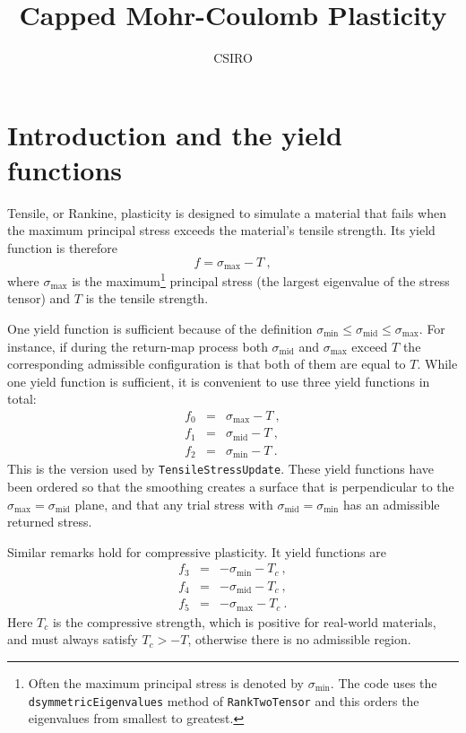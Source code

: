 \documentclass[]{scrreprt}
\newcommand{\smax}{\sigma_{\mathrm{max}}}
\newcommand{\smid}{\sigma_{\mathrm{mid}}}
\newcommand{\smin}{\sigma_{\mathrm{min}}}
\begin{document}
\title{Capped Mohr-Coulomb Plasticity}
\author{CSIRO}
\maketitle

\tableofcontents


\chapter{Introduction and the yield functions}
\label{yf.chap}

Tensile, or Rankine, plasticity is designed to simulate a material
that fails when the maximum principal stress exceeds the material's tensile
  strength.  Its yield function is therefore
\begin{equation}
  f =  \smax - T \ ,
\end{equation}
where $\smax$ is the maximum\footnote{Often the maximum
  principal stress is denoted by $\smin$.  The code uses the {\tt
    dsymmetricEigenvalues} method of {\tt RankTwoTensor} and this
  orders the eigenvalues from smallest to greatest.} principal
stress (the largest eigenvalue of the stress tensor) and $T$ is the
tensile strength.

One yield function is sufficient because of the definition
$\smin\leq\smid\leq\smax$.  For instance, if during
the return-map process both $\smid$ and $\smax$ exceed
$T$ the corresponding admissible configuration is that both of them
are equal to $T$.  While one yield function is sufficient, it is
convenient to use three yield functions in total:
\begin{eqnarray}
  f_{0} & = & \smax - T \ , \nonumber \\
  f_{1} & = & \smid - T \ , \nonumber \\
  f_{2} & = & \smin - T \ .
  \label{tensile_yfs}
\end{eqnarray}
This is the version used by {\tt TensileStressUpdate}.  These yield
functions have been ordered so that the smoothing creates a surface
that is perpendicular to the $\smax=\smid$ plane, and
that any trial stress with $\smid=\smin$ has an admissible
returned stress.

Similar remarks hold for compressive plasticity.  It yield functions
are
\begin{eqnarray}
  f_{3} & = & -\smin - T_{c} \ , \nonumber \\
  f_{4} & = & -\smid - T_{c} \ , \nonumber \\
  f_{5} & = & -\smax - T_{c}  \ .
  \label{compressive_yfs}
\end{eqnarray}
Here $T_{c}$ is the compressive strength, which is positive for
real-world materials, and must always satisfy $T_{c}>-T$,
otherwise there is no admissible region.
\end{document}
